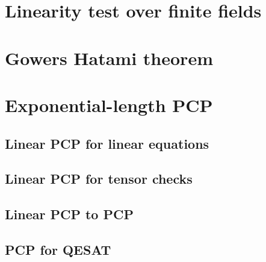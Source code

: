
%




% 
\chapter{Linearity test over finite fields}

%
\chapter{Gowers Hatami theorem}

%   

\chapter{Exponential-length PCP}


\section{Linear PCP for linear equations}

\section{Linear PCP for tensor checks}

\section{Linear PCP to PCP}

\section{PCP for QESAT}


